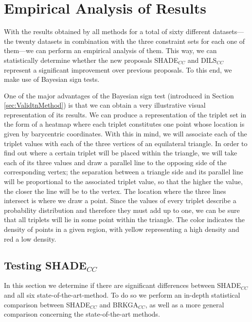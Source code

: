 \chapter{Empirical Analysis of Results} \label{ch:AnalysisResults}

With the results obtained by all methods for a total of sixty different datasets---the twenty datasets in combination with the three constraint sets for each one of them---we can perform an empirical analysis of them. This way, we can statistically determine whether the new proposals {SHADE}$_{CC}$ and \acs{DILS}$_{CC}$ represent a significant improvement over previous proposals. To this end, we make use of Bayesian sign tests.

One of the major advantages of the Bayesian sign test (introduced in Section \ref{sec:ValidtnMethod}) is that we can obtain a very illustrative visual representation of its results. We can produce a representation of the triplet set in the form of a heatmap where each triplet constitutes one point whose location is given by barycentric coordinates. With this in mind, we will associate each of the triplet values with each of the three vertices of an equilateral triangle. In order to find out where a certain triplet will be placed within the triangle, we will take each of its three values and draw a parallel line to the opposing side of the corresponding vertex; the separation between a triangle side and its parallel line will be proportional to the associated triplet value, so that the higher the value, the closer the line will be to the vertex. The location where the three lines intersect is where we draw a point. Since the values of every triplet describe a probability distribution and therefore they must add up to one, we can be sure that all triplets will lie in some point within the triangle. The color indicates the density of points in a given region, with yellow representing a high density and red a low density.

\section[Testing \acsfont{SHADE}$_{CC}$]{Testing SHADE$_{CC}$} \label{sec:TestSHADE}

In this section we determine if there are significant differences between \acs{SHADE}$_{CC}$ and all six state-of-the-art-method. To do so we perform an in-depth statistical comparison between \acs{SHADE}$_{CC}$ and \acs{BRKGA}$_{CC}$, as well as a more general comparison concerning the state-of-the-art methods.

